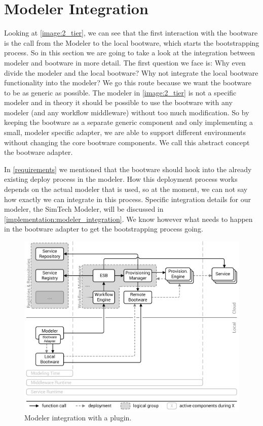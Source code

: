 \section{Modeler Integration}
\label{design:modeler_integration}

Looking at \autoref{image:2_tier}, we can see that the first interaction with the bootware is the call from the Modeler to the local bootware, which starts the bootstrapping process.
So in this section we are going to take a look at the integration between modeler and bootware in more detail.
The first question we face is: Why even divide the modeler and the local bootware?
Why not integrate the local bootware functionality into the modeler?
We go this route because we want the bootware to be as generic as possible.
The modeler in \autoref{image:2_tier} is not a specific modeler and in theory it should be possible to use the bootware with any modeler (and any workflow middleware) without too much modification.
So by keeping the bootware as a separate generic component and only implementing a small, modeler specific adapter, we are able to support different environments without changing the core bootware components.
We call this abstract concept the bootware adapter.

In \autoref{requirements} we mentioned that the bootware should hook into the already existing deploy process in the modeler.
How this deployment process works depends on the actual modeler that is used, so at the moment, we can not say how exactly we can integrate in this process.
Specific integration details for our modeler, the SimTech Modeler, will be discussed in \autoref{implementation:modeler_integration}.
We know however what needs to happen in the bootware adapter to get the bootstrapping process going.

\begin{figure}[!htbp]
	\centering
	\includegraphics[resolution=600]{design/assets/modeler_plugin}
	\caption{Modeler integration with a plugin.}
	\label{image:modeler_plugin}
\end{figure}

